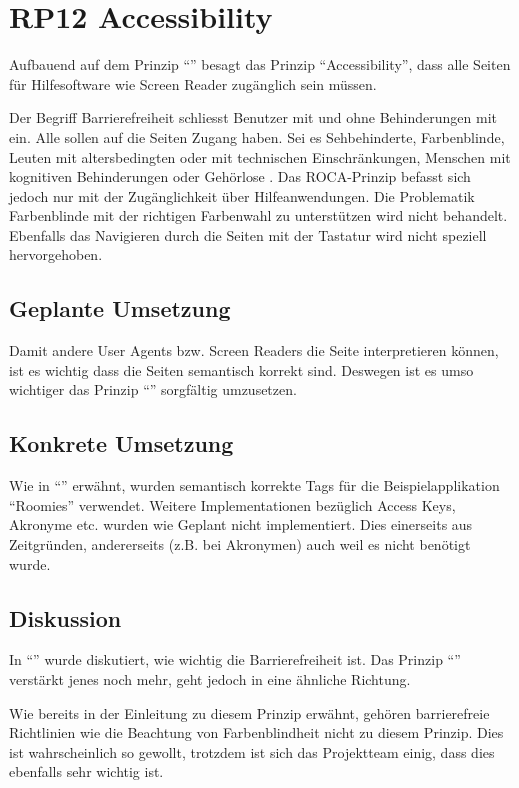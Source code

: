 \section{RP12 Accessibility}
\label{sec:principle-rp12-accessibility}
Aufbauend auf dem Prinzip ``'' besagt das Prinzip ``Accessibility'', dass alle Seiten für Hilfesoftware wie Screen Reader zugänglich sein müssen.

Der Begriff Barrierefreiheit schliesst Benutzer mit und ohne Behinderungen mit ein. Alle sollen auf die Seiten Zugang haben. Sei es Sehbehinderte, Farbenblinde, Leuten mit altersbedingten oder mit technischen Einschränkungen, Menschen mit kognitiven Behinderungen oder Gehörlose \cite{BarrierefreiesInternet}. Das ROCA-Prinzip befasst sich jedoch nur mit der Zugänglichkeit über Hilfeanwendungen. Die Problematik Farbenblinde mit der richtigen Farbenwahl zu unterstützen wird nicht behandelt. Ebenfalls das Navigieren durch die Seiten mit der Tastatur wird nicht speziell hervorgehoben.

\subsection*{Geplante Umsetzung}
Damit andere User Agents bzw. Screen Readers die Seite interpretieren können, ist es wichtig dass die Seiten semantisch korrekt sind. Deswegen ist es umso wichtiger das Prinzip ``'' sorgfältig umzusetzen.

\subsection*{Konkrete Umsetzung}
Wie in ``'' erwähnt, wurden semantisch korrekte Tags für die Beispielapplikation ``Roomies'' verwendet.
Weitere Implementationen bezüglich Access Keys, Akronyme etc. wurden wie Geplant nicht implementiert. Dies einerseits aus Zeitgründen, andererseits (z.B. bei Akronymen) auch weil es nicht benötigt wurde.

\subsection*{Diskussion}
In ``'' wurde diskutiert, wie wichtig die Barrierefreiheit ist. Das Prinzip ``'' verstärkt jenes noch mehr, geht jedoch in eine ähnliche Richtung.

Wie bereits in der Einleitung zu diesem Prinzip erwähnt, gehören barrierefreie Richtlinien wie die Beachtung von Farbenblindheit nicht zu diesem Prinzip. Dies ist wahrscheinlich so gewollt, trotzdem ist sich das Projektteam einig, dass dies ebenfalls sehr wichtig ist.
